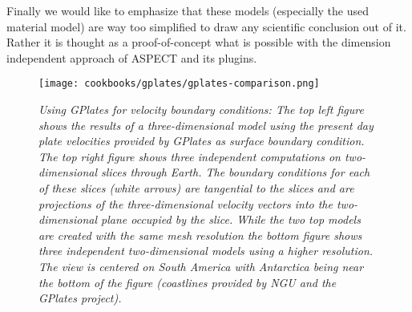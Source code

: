 \documentclass{article}
\newcommand{\aspect}{\textsc{ASPECT}}
\begin{document}
Finally we would like to emphasize that these models (especially the used material model)
are way too simplified to draw any scientific conclusion out of it. Rather it is thought
as a proof-of-concept what is possible with the dimension independent approach of
\aspect{} and its plugins.

\begin{figure}
  \texttt{[image: cookbooks/gplates/gplates-comparison.png]}
  \hfill
  \caption{\it Using GPlates for velocity boundary conditions: The top left figure shows
  the results of a three-dimensional model using the present day plate velocities
  provided by GPlates as surface boundary condition. 
  The top right figure shows three independent computations 
  on two-dimensional slices through Earth. The boundary conditions for each of these slices (white
  arrows) are tangential to the slices and are projections of the
  three-dimensional velocity vectors into the two-dimensional plane
  occupied by the slice. While the two top models are created with the same mesh resolution
  the bottom figure shows three independent two-dimensional models using a higher resolution. 
  The view is centered on South America with Antarctica being near the bottom of
  the figure (coastlines provided by NGU and the GPlates project).}
  \label{fig:gv-1}
\end{figure}
\end{document}
